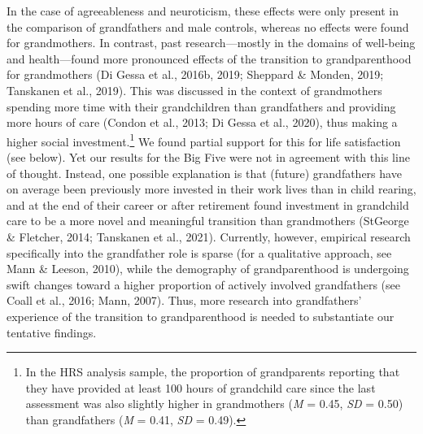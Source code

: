 \documentclass[
  english,
  man, noextraspace]{apa7}
\begin{document}
In the case of agreeableness and neuroticism, these effects were only present in the comparison of grandfathers and male controls, whereas no effects were found for grandmothers. In contrast, past research---mostly in the domains of well-being and health---found more pronounced effects of the transition to grandparenthood for grandmothers (Di Gessa et al., 2016b, 2019; Sheppard \& Monden, 2019; Tanskanen et al., 2019). This was discussed in the context of grandmothers spending more time with their grandchildren than grandfathers and providing more hours of care (Condon et al., 2013; Di Gessa et al., 2020), thus making a higher social investment.\footnote{In the HRS analysis sample, the proportion of grandparents reporting that they have provided at least 100 hours of grandchild care since the last assessment was also slightly higher in grandmothers (\emph{M} = 0.45, \emph{SD} = 0.50) than grandfathers (\emph{M} = 0.41, \emph{SD} = 0.49).} We found partial support for this for life satisfaction (see below). Yet our results for the Big Five were not in agreement with this line of thought. Instead, one possible explanation is that (future) grandfathers have on average been previously more invested in their work lives than in child rearing, and at the end of their career or after retirement found investment in grandchild care to be a more novel and meaningful transition than grandmothers (StGeorge \& Fletcher, 2014; Tanskanen et al., 2021). Currently, however, empirical research specifically into the grandfather role is sparse (for a qualitative approach, see Mann \& Leeson, 2010), while the demography of grandparenthood is undergoing swift changes toward a higher proportion of actively involved grandfathers (see Coall et al., 2016; Mann, 2007). Thus, more research into grandfathers' experience of the transition to grandparenthood is needed to substantiate our tentative findings.\\
\end{document}

